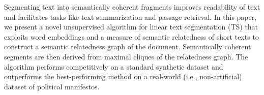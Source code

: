 Segmenting text into semantically coherent fragments improves readability of text and facilitates tasks like text summarization and passage retrieval. In this paper, we present a novel unsupervised algorithm for linear text segmentation (TS) that exploits word embeddings and a measure of semantic relatedness of short texts to construct a semantic relatedness graph of the document. Semantically coherent segments are then derived from maximal cliques of the relatedness graph. The algorithm performs competitively on a standard synthetic dataset and outperforms the best-performing method on a real-world (i.e., non-artificial) dataset of political manifestos.
